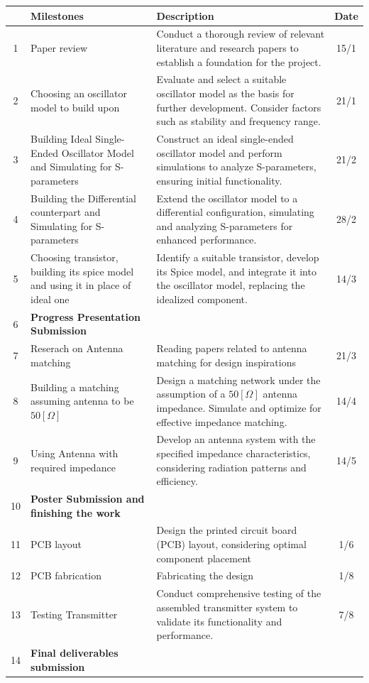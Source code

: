 \documentclass[]{extarticle}
\begin{document}
\begin{tabular}{|c|p{5cm}|p{9cm}|c|}
    \hline
    & Milestones & Description & Date \\
    \hline
    1 & Paper review & Conduct a thorough review of relevant literature and research papers to establish a foundation for the project. & 15/1 \\
    \hline
    2 & Choosing an oscillator model to build upon & Evaluate and select a suitable oscillator model as the basis for further development. Consider factors such as stability and frequency range. & 21/1 \\
    \hline
    3 & Building Ideal Single-Ended Oscillator Model and Simulating for S-parameters & Construct an ideal single-ended oscillator model and perform simulations to analyze S-parameters, ensuring initial functionality. & 21/2 \\
    \hline
    4 & Building the Differential counterpart and Simulating for S-parameters & Extend the oscillator model to a differential configuration, simulating and analyzing S-parameters for enhanced performance. & 28/2 \\
    \hline
    5 & Choosing transistor, building its spice model and using it in place of ideal one & Identify a suitable transistor, develop its Spice model, and integrate it into the oscillator model, replacing the idealized component. & 14/3 \\
    \hline
    6 & \textbf{Progress Presentation Submission} &  &  \\
    \hline
    7 & Reserach on Antenna matching  & Reading papers related to antenna matching for design inspirations & 21/3 \\
    \hline
    8 & Building a matching assuming antenna to be \(50[\Omega]\) & Design a matching network under the assumption of a \(50[\Omega]\) antenna impedance. Simulate and optimize for effective impedance matching. & 14/4 \\
    \hline
    9 & Using Antenna with required impedance & Develop an antenna system with the specified impedance characteristics, considering radiation patterns and efficiency. & 14/5 \\
    \hline
    10 & \textbf{Poster Submission and finishing the work} &  &  \\
    \hline
    11 & PCB layout & Design the printed circuit board (PCB) layout, considering optimal component placement& 1/6 \\
    \hline
    12 & PCB fabrication& Fabricating the design & 1/8 \\
    \hline
    13 & Testing Transmitter & Conduct comprehensive testing of the assembled transmitter system to validate its functionality and performance. & 7/8 \\
    \hline
    14 & \textbf{Final deliverables submission} & & \\
    \hline
\end{tabular}



\newpage


\end{document}
